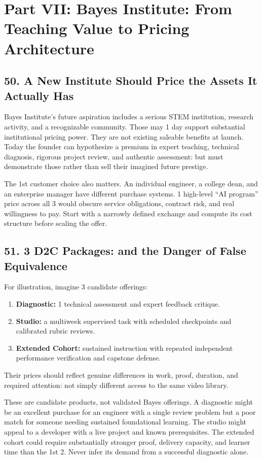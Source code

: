 \section*{Part VII: Bayes Institute: From Teaching Value to Pricing Architecture}

\subsection*{50. A New Institute Should Price the Assets It Actually Has}

Bayes Institute's future aspiration includes a serious STEM institution, research activity, and a recognizable community. Those may 1 day support substantial institutional pricing power. They are not existing saleable benefits at launch. Today the founder can hypothesize a premium in expert teaching, technical diagnosis, rigorous project review, and authentic assessment: but must demonstrate those rather than sell their imagined future prestige.

The 1st customer choice also matters. An individual engineer, a college dean, and an enterprise manager have different purchase systems. 1 high-level ``AI program'' price across all 3 would obscure service obligations, contract risk, and real willingness to pay. Start with a narrowly defined exchange and compute its cost structure before scaling the offer.

\subsection*{51. 3 D2C Packages: and the Danger of False Equivalence}

For illustration, imagine 3 candidate offerings:
\begin{enumerate}
  \item \textbf{Diagnostic:} 1 technical assessment and expert feedback critique.
  \item \textbf{Studio:} a multiweek supervised task with scheduled checkpoints and calibrated rubric reviews.
  \item \textbf{Extended Cohort:} sustained instruction with repeated independent performance verification and capstone defense.
\end{enumerate}
Their prices should reflect genuine differences in work, proof, duration, and required attention: not simply different access to the same video library.

These are candidate products, not validated Bayes offerings. A diagnostic might be an excellent purchase for an engineer with a single review problem but a poor match for someone needing sustained foundational learning. The studio might appeal to a developer with a live project and known prerequisites. The extended cohort could require substantially stronger proof, delivery capacity, and learner time than the 1st 2. Never infer its demand from a successful diagnostic alone.

